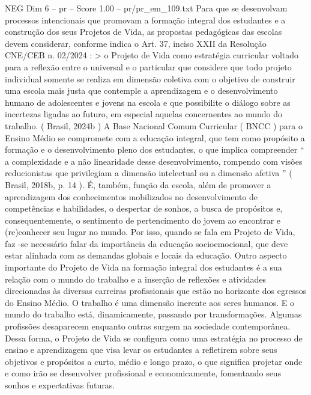 \begin{textsample}{NEG Dim 6 – pr – Score 1.00 – pr/pr\_em\_109.txt}
Para que se desenvolvam processos intencionais que promovam a formação integral dos estudantes e a construção dos seus Projetos de Vida, as propostas pedagógicas das escolas devem considerar, conforme indica o Art. 37, inciso XXII da Resolução CNE/CEB n. 02/2024 : > o Projeto de Vida como estratégia curricular voltado para a reflexão entre o universal e o particular que considere que todo projeto individual somente se realiza em dimensão coletiva com o objetivo de construir uma escola mais justa que contemple a aprendizagem e o desenvolvimento humano de adolescentes e jovens na escola e que possibilite o diálogo sobre as incertezas ligadas ao futuro, em especial aquelas concernentes ao mundo do trabalho. ( Brasil, 2024b ) A Base Nacional Comum Curricular ( BNCC ) para o Ensino Médio se compromete com a educação integral, que tem como propósito a formação e o desenvolvimento pleno dos estudantes, o que implica compreender “ a complexidade e a não linearidade desse desenvolvimento, rompendo com visões reducionistas que privilegiam a dimensão intelectual ou a dimensão afetiva ” ( Brasil, 2018b, p. 14 ).
É, também, função da escola, além de promover a aprendizagem dos conhecimentos mobilizados no desenvolvimento de competências e habilidades, o despertar de sonhos, a busca de propósitos e, consequentemente, o sentimento de pertencimento do jovem ao encontrar e (re)conhecer seu lugar no mundo.
Por isso, quando se fala em Projeto de Vida, faz -se necessário falar da importância da educação socioemocional, que deve estar alinhada com as demandas globais e locais da educação.
Outro aspecto importante do Projeto de Vida na formação integral dos estudantes é a sua relação com o mundo do trabalho e a inserção de reflexões e atividades direcionadas às diversas carreiras profissionais que estão no horizonte dos egressos do Ensino Médio.
O trabalho é uma dimensão inerente aos seres humanos.
E o mundo do trabalho está, dinamicamente, passando por transformações.
Algumas profissões desaparecem enquanto outras surgem na sociedade contemporânea.
Dessa forma, o Projeto de Vida se configura como uma estratégia no processo de ensino e aprendizagem que visa levar os estudantes a refletirem sobre seus objetivos e propósitos a curto, médio e longo prazo, o que significa projetar onde e como irão se desenvolver profissional e economicamente, fomentando seus sonhos e expectativas futuras.

\end{textsample}
